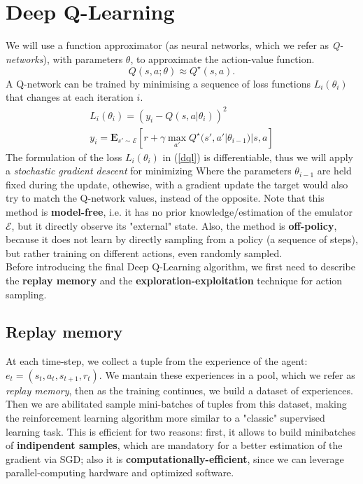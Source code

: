 \documentclass{article}
\begin{document}
\section{Deep Q-Learning}

We will use a function approximator (as neural networks, which we refer as \textit{Q-networks}), with parameters $\theta$, to approximate the action-value function.
\begin{equation}
	Q(s, a; \theta) \approx Q ^\star (s, a). 
\end{equation}
A Q-network can be trained by minimising a sequence of loss functions $L_i(\theta _i )$ that changes at each
iteration $i$.
\begin{equation}
\label{dql}
\begin{aligned}
	L_i(\theta _i ) = (y_i - Q(s,a|\theta_i))^2 \\
	y_i = \mathbf{E}_{s' \sim \mathcal{E}} [ r + \gamma \max_{a'} Q^\star(s', a'|\theta_{i-1}) | s, a  ]
\end{aligned}
\end{equation}
The formulation of the loss $L_i(\theta_i)$ in (\ref{dql}) is differentiable, thus we will apply a \textit{stochastic gradient descent} for minimizing 
Where the parameters $\theta_{i-1}$ are held fixed during the update, othewise, with a gradient update the target would also try to match the Q-network values, instead of the opposite. Note that this method is \textbf{model-free}, i.e. it has no prior knowledge/estimation of the emulator $\mathcal{E}$, but it directly observe its "external" state. Also, the method is \textbf{off-policy}, because it does not learn by directly sampling from a policy (a sequence of steps), but rather training on different actions, even randomly sampled.\\
Before introducing the final Deep Q-Learning algorithm, we first need to describe the \textbf{replay memory} and the \textbf{exploration-exploitation} technique for action sampling.
\subsection{Replay memory}
At each time-step, we collect a tuple from the experience of the agent: $e_t = (s_t, a_t, s_{t+1}, r_t)$. We mantain these experiences in a pool, which we refer as \textit{replay memory}, then as the training continues, we build a dataset of experiences. Then we are abilitated sample mini-batches of tuples from this dataset, making the reinforcement learning algorithm more similar to a "classic" supervised learning task. This is efficient for two reasons: first, it allows to build minibatches of \textbf{indipendent samples}, which are mandatory for a better estimation of the gradient via SGD; also it is \textbf{computationally-efficient}, since we can leverage parallel-computing hardware and optimized software.
\end{document}
